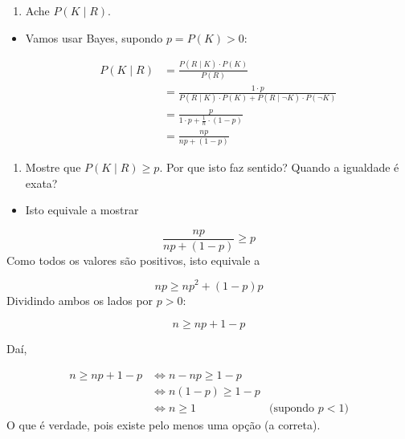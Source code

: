 \documentclass[
  11pt]{report}
\providecommand{\tightlist}{%
  \setlength{\itemsep}{0pt}\setlength{\parskip}{0pt}}
\begin{document}
\begin{rmdbox}

\begin{enumerate}
\def\labelenumi{(\alph{enumi})}
\tightlist
\item
  Ache $P(K \mid R)$.
\end{enumerate}

\end{rmdbox}

\begin{itemize}
\item
  Vamos usar Bayes, supondo $p = P(K) > 0$:

  \[
  \begin{aligned}
  P(K \mid R)
  &=
  \frac{P(R \mid K) \cdot P(K)}{P(R)} \\
  &=
  \frac{1 \cdot p}{
    P(R \mid K) \cdot P(K) + 
    P(R \mid \neg K) \cdot P(\neg K)
  } \\
  &=
  \frac{p}{
    1 \cdot p + 
    \frac{1}{n} \cdot (1 - p)
  } \\
  &=
  \frac{np}{np + (1 - p)}
  \end{aligned}
  \]
\end{itemize}

\begin{rmdbox}

\begin{enumerate}
\def\labelenumi{(\alph{enumi})}
\setcounter{enumi}{1}
\tightlist
\item
  Mostre que $P(K \mid R) \geq p$. Por que isto faz sentido? Quando a igualdade é exata?
\end{enumerate}

\end{rmdbox}

\begin{itemize}
\tightlist
\item
  Isto equivale a mostrar
\end{itemize}

\[
 \frac{np}{np + (1 - p)} \geq p
 \]
Como todos os valores são positivos, isto equivale a

\[
 np \geq np^2 + (1 - p)p
 \]
Dividindo ambos os lados por $p > 0$:

\[
 n \geq np + 1 - p
 \]

Daí,

\[
 \begin{aligned}
 n \geq np + 1 - p 
 &\iff n - np \geq 1 - p \\
 &\iff n(1 - p) \geq 1 - p \\
 &\iff n \geq 1 & \text{(supondo } p < 1 \text{)}
 \end{aligned}
 \]
O que é verdade, pois existe pelo menos uma opção (a correta).
\end{document}
